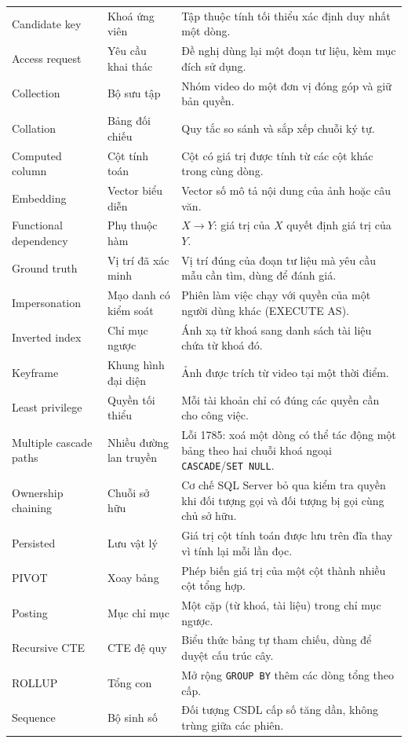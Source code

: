 \begin{longtable}{
    >{\raggedright\arraybackslash}p{}
    >{\raggedright\arraybackslash}p{}
    >{\raggedright\arraybackslash}p{}
}
Candidate key & Khoá ứng viên & Tập thuộc tính tối thiểu xác định duy nhất một dòng. \\
Access request & Yêu cầu khai thác & Đề nghị dùng lại một đoạn tư liệu, kèm mục đích sử dụng. \\
Collection & Bộ sưu tập & Nhóm video do một đơn vị đóng góp và giữ bản quyền. \\
Collation & Bảng đối chiếu & Quy tắc so sánh và sắp xếp chuỗi ký tự. \\
Computed column & Cột tính toán & Cột có giá trị được tính từ các cột khác trong cùng dòng. \\
Embedding & Vector biểu diễn & Vector số mô tả nội dung của ảnh hoặc câu văn. \\
Functional dependency & Phụ thuộc hàm & $X \rightarrow Y$: giá trị của $X$ quyết định giá trị của $Y$. \\
Ground truth & Vị trí đã xác minh & Vị trí đúng của đoạn tư liệu mà yêu cầu mẫu cần tìm, dùng để đánh giá. \\
Impersonation & Mạo danh có kiểm soát & Phiên làm việc chạy với quyền của một người dùng khác (EXECUTE AS). \\
Inverted index & Chỉ mục ngược & Ánh xạ từ khoá sang danh sách tài liệu chứa từ khoá đó. \\
Keyframe & Khung hình đại diện & Ảnh được trích từ video tại một thời điểm. \\
Least privilege & Quyền tối thiểu & Mỗi tài khoản chỉ có đúng các quyền cần cho công việc. \\
Multiple cascade paths & Nhiều đường lan truyền & Lỗi 1785: xoá một dòng có thể tác động một bảng theo hai chuỗi khoá ngoại \texttt{CASCADE}/\texttt{SET NULL}. \\
Ownership chaining & Chuỗi sở hữu & Cơ chế SQL Server bỏ qua kiểm tra quyền khi đối tượng gọi và đối tượng bị gọi cùng chủ sở hữu. \\
Persisted & Lưu vật lý & Giá trị cột tính toán được lưu trên đĩa thay vì tính lại mỗi lần đọc. \\
PIVOT & Xoay bảng & Phép biến giá trị của một cột thành nhiều cột tổng hợp. \\
Posting & Mục chỉ mục & Một cặp (từ khoá, tài liệu) trong chỉ mục ngược. \\
Recursive CTE & CTE đệ quy & Biểu thức bảng tự tham chiếu, dùng để duyệt cấu trúc cây. \\
ROLLUP & Tổng con & Mở rộng \texttt{GROUP BY} thêm các dòng tổng theo cấp. \\
Sequence & Bộ sinh số & Đối tượng CSDL cấp số tăng dần, không trùng giữa các phiên. \\

\end{longtable}
